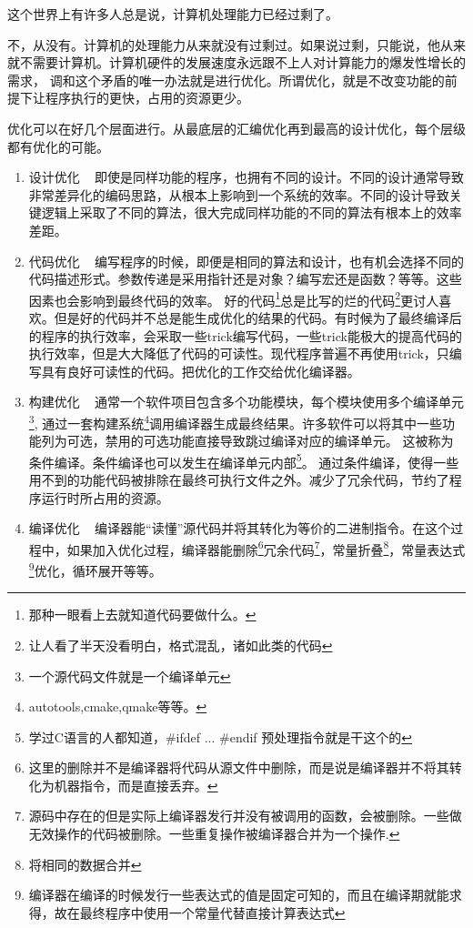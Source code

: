 

这个世界上有许多人总是说，计算机处理能力已经过剩了。

不，从没有。计算机的处理能力从来就没有过剩过。如果说过剩，只能说，他从来就不需要计算机。计算机硬件的发展速度永远跟不上人对计算能力的爆发性增长的需求，
调和这个矛盾的唯一办法就是进行优化。所谓优化，就是不改变功能的前提下让程序执行的更快，占用的资源更少。

优化可以在好几个层面进行。从最底层的汇编优化再到最高的设计优化，每个层级都有优化的可能。

\begin{enumerate}
\item 设计优化	~	即使是同样功能的程序，也拥有不同的设计。不同的设计通常导致非常差异化的编码思路，从根本上影响到一个系统的效率。不同的设计导致关键逻辑上采取了不同的算法，很大完成同样功能的不同的算法有根本上的效率差距。

\item 代码优化	~	编写程序的时候，即便是相同的算法和设计，也有机会选择不同的代码描述形式。参数传递是采用指针还是对象？编写宏还是函数？等等。这些因素也会影响到最终代码的效率。
好的代码\footnote{那种一眼看上去就知道代码要做什么。}总是比写的烂的代码\footnote{让人看了半天没看明白，格式混乱，诸如此类的代码}更讨人喜欢。但是好的代码并不总是能生成优化的结果的代码。有时候为了最终编译后的程序的执行效率，会采取一些trick编写代码，一些trick能极大的提高代码的执行效率，但是大大降低了代码的可读性。现代程序普遍不再使用trick，只编写具有良好可读性的代码。把优化的工作交给优化编译器。

\item 构建优化	~	通常一个软件项目包含多个功能模块，每个模块使用多个编译单元\footnote{一个源代码文件就是一个编译单元}, 通过一套构建系统\footnote{autotools,cmake,qmake等等。}调用编译器生成最终结果。许多软件可以将其中一些功能列为可选，禁用的可选功能直接导致跳过编译对应的编译单元。
这被称为条件编译。条件编译也可以发生在编译单元内部\footnote{学过C语言的人都知道，\#ifdef ... \#endif 预处理指令就是干这个的}。
通过条件编译，使得一些用不到的功能代码被排除在最终可执行文件之外。减少了冗余代码，节约了程序运行时所占用的资源。

\item 编译优化	~	编译器能“读懂”源代码并将其转化为等价的二进制指令。在这个过程中，如果加入优化过程，编译器能删除\footnote{这里的删除并不是编译器将代码从源文件中删除，而是说是编译器并不将其转化为机器指令，而是直接丢弃。}冗余代码\footnote{源码中存在的但是实际上编译器发行并没有被调用的函数，会被删除。一些做无效操作的代码被删除。一些重复操作被编译器合并为一个操作.}，常量折叠\footnote{将相同的数据合并}，常量表达式\footnote{编译器在编译的时候发行一些表达式的值是固定可知的，而且在编译期就能求得，故在最终程序中使用一个常量代替直接计算表达式}优化，循环展开等等。


\end{enumerate}
